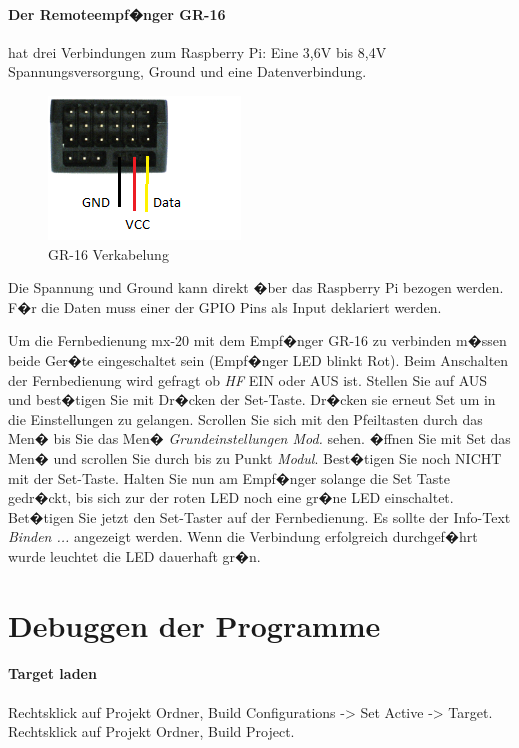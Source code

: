 \paragraph{Der Remoteempf�nger GR-16} hat drei Verbindungen zum Raspberry Pi:
Eine 3,6V bis 8,4V Spannungsversorgung, Ground und eine Datenverbindung.
\label{Receiver}
\begin{figure}[H]
	\centering
	\includegraphics{fig_motor/GR-16.png}
	\caption[GR-16 Verkabelung]{GR-16 Verkabelung\protect\footnotemark}
\end{figure}
Die Spannung und Ground kann direkt �ber das Raspberry Pi bezogen werden. F�r die Daten muss einer der GPIO Pins als Input deklariert werden.

Um die Fernbedienung mx-20 mit dem Empf�nger GR-16 zu verbinden m�ssen beide Ger�te eingeschaltet sein (Empf�nger LED blinkt Rot). Beim Anschalten der Fernbedienung wird gefragt ob \emph{HF} EIN oder AUS ist. Stellen Sie auf AUS und best�tigen Sie mit Dr�cken der Set-Taste. Dr�cken sie erneut Set um in die Einstellungen zu gelangen. Scrollen Sie sich mit den Pfeiltasten durch das Men� bis Sie das Men� \emph{Grundeinstellungen Mod.} sehen. �ffnen Sie mit Set das Men� und scrollen Sie durch bis zu Punkt \emph{Modul}. Best�tigen Sie noch NICHT mit der Set-Taste. 
Halten Sie nun am Empf�nger solange die Set Taste gedr�ckt, bis sich zur der roten LED noch eine gr�ne LED einschaltet. Bet�tigen Sie jetzt den Set-Taster auf der Fernbedienung. Es sollte der Info-Text \emph{Binden ...} angezeigt werden.
Wenn die Verbindung erfolgreich durchgef�hrt wurde leuchtet die LED dauerhaft gr�n. \cite{doc:gt-16}

\newpage

\section{Debuggen der Programme}

\paragraph{Target laden}
Rechtsklick auf Projekt Ordner, \newline
Build Configurations -> Set Active -> Target.\newline
Rechtsklick auf Projekt Ordner, Build Project.

